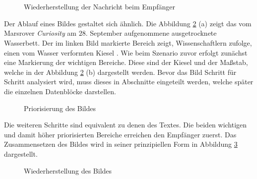 \begin{figure}[H]
	\centering
	\\
	\\
	\label{fig:chatguiexample}
	\caption{Wiederherstellung der Nachricht beim Empfänger}
\end{figure}

Der Ablauf eines Bildes gestaltet sich ähnlich. Die Abbildung
\ref{fig:marsWaterResidue} (a) zeigt das vom Marsrover \textit{Curiosity}
am $28.$ September aufgenommene ausgetrocknete Wasserbett. Der im
linken Bild markierte Bereich zeigt, Wissenschaftlern zufolge, einen vom Wasser
verformten Kiesel \cite{web11}. Wie beim Szenario zuvor erfolgt zunächst
eine Markierung der wichtigen Bereiche. Diese sind der Kiesel und der Maßstab, welche in der
Abbildung \ref{fig:marsWaterResidue} (b) dargestellt werden. Bevor das Bild
Schritt für Schritt analysiert wird, muss dieses in Abschnitte eingeteilt
werden, welche später die einzelnen Datenblöcke darstellen.
 
\begin{figure}[H]
	\centering
	\hfill
	\hfill
	\label{fig:marsWaterResidue}
	\caption[Priorisierung des Bildes]{Priorisierung des Bildes \cite{img3}}
\end{figure}

Die weiteren Schritte sind equivalent zu denen des Textes. Die beiden wichtigen
und damit höher priorisierten Bereiche erreichen den Empfänger zuerst.
Das Zusammensetzen des Bildes wird in seiner prinzipiellen Form in
Abbildung \ref{fig:marsWaterResidueEmpfaenger} dargestellt.

\begin{figure}[H]
	\centering
	\hfill
	\hfill
	\label{fig:marsWaterResidueEmpfaenger}
	\caption{Wiederherstellung des Bildes}
\end{figure}